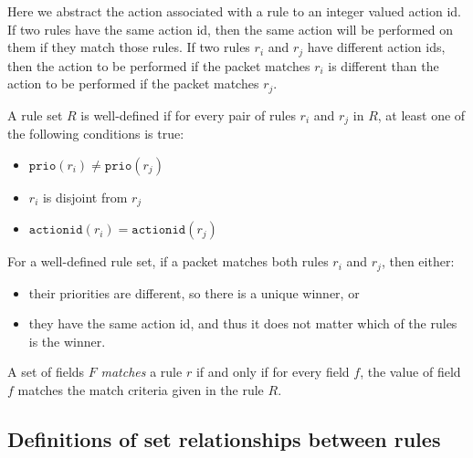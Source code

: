 \documentclass[acmsmall]{acmart}
\newcommand{\prio}[1]{}
\renewcommand{\prio}[1]{\ensuremath{\mathtt{prio}({#1})}}
\newcommand{\actionid}[1]{}
\renewcommand{\actionid}[1]{\ensuremath{\mathtt{actionid}({#1})}}
\begin{document}
Here we abstract the action associated with a rule to an integer valued action id.
If two rules have the same action id, then the same action will be performed on them
if they match those rules.
If two rules $r_i$ and $r_j$ have different action ids,
then the action to be performed if the packet matches $r_i$ is different
than the action to be performed if the packet matches $r_j$.

\begin{definition}
\label{defn:well-defined-rule-set}
A rule set $R$ is well-defined if
for every pair of rules $r_i$ and $r_j$ in $R$,
at least one of the following conditions is true:
\begin{itemize}
\item $\prio{r_i} \neq \prio{r_j}$
\item $r_i$ is disjoint from $r_j$
\item $\actionid{r_i} = \actionid{r_j}$
\end{itemize}
\end{definition}

For a well-defined rule set,
if a packet matches both rules $r_i$ and $r_j$, then either:
\begin{itemize}
\item their priorities are different, so there is a unique winner, or
\item they have the same action id,
    and thus it does not matter which of the rules is the winner.
\end{itemize}

%
%

\begin{definition}
\label{defn:match}
A set of fields $F$ {\em matches} a rule $r$ if and only if for every field $f$,
the value of field $f$ matches the match criteria given in the rule $R$.
\end{definition}


\subsection{Definitions of set relationships between rules}
\end{document}
